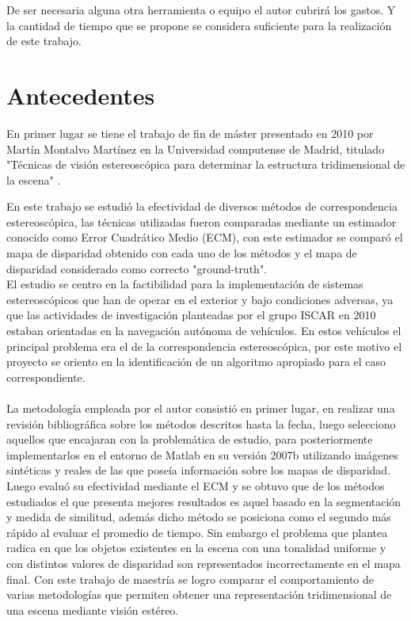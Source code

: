 De ser necesaria alguna otra herramienta o equipo el autor cubrirá los gastos. Y la cantidad de tiempo que se propone se considera suficiente para la realización de este trabajo.
\section{Antecedentes}
En primer lugar se tiene el trabajo de fin de máster presentado en 2010 por
Martín Montalvo Martínez en la Universidad computense de Madrid, titulado "Técnicas de visión estereoscópica para determinar la estructura tridimensional de la escena"  \cite{MartinMM}.

En este trabajo se estudió la efectividad de diversos métodos de correspondencia estereoscópica, las técnicas utilizadas fueron comparadas mediante un estimador conocido como Error Cuadrático Medio (ECM), con este estimador se comparó el mapa de disparidad obtenido con cada uno de los métodos y el mapa de disparidad considerado como correcto "ground-truth". 
\\
El estudio se centro en la factibilidad para la implementación de sistemas estereoscópicos que han de operar en el exterior y bajo condiciones adversas, ya que las actividades de investigación planteadas por el grupo ISCAR en 2010 estaban orientadas en la navegación autónoma de vehículos. En estos vehículos el principal problema era el de la correspondencia estereoscópica, por este motivo el proyecto se oriento en la identificación de un algoritmo apropiado para el caso correspondiente.
\\
\\
La metodología empleada por el autor consistió en primer lugar, en realizar una revisión bibliográfica sobre los métodos descritos hasta la fecha, luego selecciono aquellos que encajaran con la problemática de estudio, para posteriormente implementarlos en el entorno de Matlab en su versión 2007b utilizando imágenes sintéticas y reales de las que poseía información sobre los mapas de disparidad. Luego evaluó su efectividad mediante el ECM y se obtuvo que de los métodos estudiados el que presenta mejores resultados es aquel basado en la segmentación y medida de similitud, además dicho método  se posiciona como el segundo más rápido al evaluar el promedio de tiempo. Sin embargo el problema que plantea radica en que los objetos existentes en la escena con una tonalidad uniforme y con distintos valores de disparidad son representados incorrectamente en el mapa final. Con este trabajo de maestría se logro comparar el comportamiento de varias metodologías que permiten obtener una representación tridimensional de una escena mediante visión estéreo.
